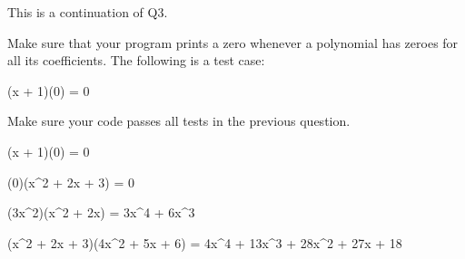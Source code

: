 This is a continuation of Q3.

Make sure that your program prints a zero whenever a polynomial has zeroes for all its coefficients. 
The following is a test case:
\begin{console}[commandchars=\\\{\}]
(x + 1)(0) = 0
\end{console}

Make sure your code passes all tests in the previous question.

\resett
\nextt
\begin{console}[commandchars=\\\{\}]
(x + 1)(0) = 0
\end{console}

\nextt
\begin{console}[commandchars=\\\{\}]
(0)(x^2 + 2x + 3) = 0
\end{console}

\nextt
\begin{console}[commandchars=\\\{\}]
(3x^2)(x^2 + 2x) = 3x^4 + 6x^3
\end{console}

\nextt
\begin{console}[commandchars=\\\{\}]
(x^2 + 2x + 3)(4x^2 + 5x + 6) = 4x^4 + 13x^3 + 28x^2 + 27x + 18
\end{console}

